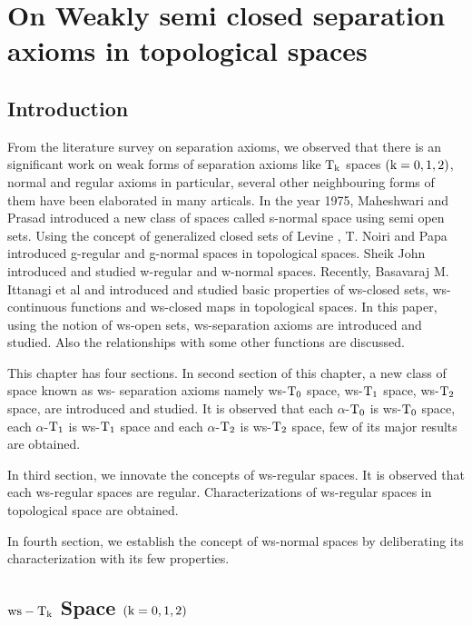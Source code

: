 \chapter{On Weakly semi closed separation axioms in topological spaces}
\graphicspath{{Chapter8/Chapter8Figs/EPS/}{Chapter8/Chapter8Figs/}}

\section{Introduction}\label{sec8.1}


From the literature survey on separation axioms, we observed that there is an significant work on weak forms of separation axioms like $\mathrm{T}_{\mathrm{k}}$ spaces $(\mathrm{k}=0, 1, 2)$, normal and regular axioms in particular, several other neighbouring forms of them have been elaborated in many articals. In the year 1975, Maheshwari and Prasad \cite{key6} introduced a new class of spaces called s-normal space using semi open sets. Using the concept of generalized closed sets of Levine \cite{key5}, T. Noiri and Papa \cite{key7} introduced g-regular and g-normal spaces in topological spaces. Sheik John \cite{key8} introduced and studied w-regular and w-normal spaces. Recently, Basavaraj M. Ittanagi et al \cite{key1,key2} and \cite{key3} introduced and studied basic properties of ws-closed sets, ws-continuous functions and ws-closed maps in topological spaces. In this paper, using the notion of ws-open sets, ws-separation axioms are introduced and studied. Also the relationships with some other functions are discussed.

This chapter has four sections. In second section of this chapter, a new class of space known as ws- separation axioms namely ws-$\mathrm{T}_{0}$ space, ws-$\mathrm{T}_{1}$ space, ws-$\mathrm{T}_{2}$ space, are introduced and studied. It is observed that each $\alpha$-$\mathrm{T}_{0}$ is ws-$\mathrm{T}_{0}$ space, each $\alpha$-$\mathrm{T}_{1}$ is ws-$\mathrm{T}_{1}$ space and each $\alpha$-$\mathrm{T}_{2}$ is ws-$\mathrm{T}_{2}$ space, few of its major results are obtained.

\newpage

In third section, we innovate the concepts of ws-regular spaces. It is observed that each ws-regular spaces are regular. Characterizations of ws-regular spaces in topological space are obtained.

In fourth section, we establish the concept of ws-normal spaces by deliberating its characterization with its few properties.

\section{\boldmath$\mathrm{ws}-\mathrm{T}_{\mathrm{k}}$ Space $(\mathrm{k}=0,1,2)$}\label{sec8.2}


